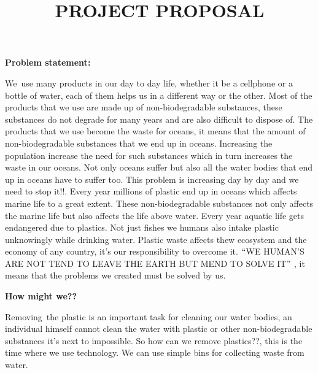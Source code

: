 \documentclass[12pt]{article}
\title{PROJECT PROPOSAL}
\date{}
\begin{document}
\maketitle
\par

\par

\par

\par

{\fontsize{24pt}{28.8pt}\selectfont \textbf{Problem statement:}\par}\par

We\ use many products in our day to day life, whether it be a cellphone or a bottle of water, each of them helps us in a different way or the other. Most of the products that we use are made up of non-biodegradable substances, these substances do not degrade for many years and are also difficult to dispose of.  The products that we use become the waste for oceans, it means that the amount of non-biodegradable substances that we end up in oceans. Increasing the population increase the need for such substances which in turn increases the waste in our oceans. Not only oceans suffer but also all the water bodies that end up in oceans have to suffer too. This problem is increasing day by day and we need to stop it!!. Every year millions of plastic end up in oceans which affects marine life to a great extent. These non-biodegradable substances not only affects the marine life but also affects the life above water. Every year aquatic life gets endangered due to plastics. Not just fishes we humans also intake plastic unknowingly while drinking water. Plastic waste affects thew ecosystem and the economy of any country, it’s our responsibility to overcome it. $``$WE HUMAN’S ARE NOT TEND TO LEAVE THE EARTH BUT MEND TO SOLVE IT$"$ , it means that the problems we created must be solved by us.\par

{\fontsize{24pt}{28.8pt}\selectfont \textbf{How might we?? }\par}\par

Removing\ the plastic is an important task for cleaning our water bodies, an individual himself cannot clean the water with plastic or other non-biodegradable substances it’s next to impossible.  So how can we remove plastics??, this is the time where we use technology. We can use simple bins for collecting waste from water.\par
\end{document}
